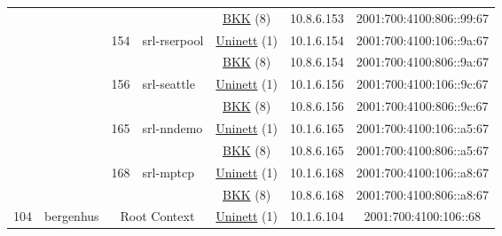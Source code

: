 \begin{small}
\begin{center}
\begin{longtable}{|c|c|c|c|c|c|c|c|}
  &  &  &  & \multicolumn{2}{|c|}{\tiny{\href{http://bkk.no}{BKK} (8)}} & \tiny{10.8.6.153} & \tiny{2001:700:4100:806::99:67} \\* \cline{3-3}\cline{4-4}\cline{5-5}\cline{6-6}\cline{7-7}\cline{8-8}
  &  & \multirow{2}{*}{\tiny{154}} & \multicolumn{1}{|l|}{\multirow{2}{*}{\tiny{srl-rserpool}}} & \multicolumn{2}{|c|}{\tiny{\href{https://www.uninett.no}{Uninett} (1)}} & \tiny{10.1.6.154} & \tiny{2001:700:4100:106::9a:67} \\* \cline{5-5}\cline{6-6}\cline{7-7}\cline{8-8}
  &  &  &  & \multicolumn{2}{|c|}{\tiny{\href{http://bkk.no}{BKK} (8)}} & \tiny{10.8.6.154} & \tiny{2001:700:4100:806::9a:67} \\* \cline{3-3}\cline{4-4}\cline{5-5}\cline{6-6}\cline{7-7}\cline{8-8}
  &  & \multirow{2}{*}{\tiny{156}} & \multicolumn{1}{|l|}{\multirow{2}{*}{\tiny{srl-seattle}}} & \multicolumn{2}{|c|}{\tiny{\href{https://www.uninett.no}{Uninett} (1)}} & \tiny{10.1.6.156} & \tiny{2001:700:4100:106::9c:67} \\* \cline{5-5}\cline{6-6}\cline{7-7}\cline{8-8}
  &  &  &  & \multicolumn{2}{|c|}{\tiny{\href{http://bkk.no}{BKK} (8)}} & \tiny{10.8.6.156} & \tiny{2001:700:4100:806::9c:67} \\* \cline{3-3}\cline{4-4}\cline{5-5}\cline{6-6}\cline{7-7}\cline{8-8}
  &  & \multirow{2}{*}{\tiny{165}} & \multicolumn{1}{|l|}{\multirow{2}{*}{\tiny{srl-nndemo}}} & \multicolumn{2}{|c|}{\tiny{\href{https://www.uninett.no}{Uninett} (1)}} & \tiny{10.1.6.165} & \tiny{2001:700:4100:106::a5:67} \\* \cline{5-5}\cline{6-6}\cline{7-7}\cline{8-8}
  &  &  &  & \multicolumn{2}{|c|}{\tiny{\href{http://bkk.no}{BKK} (8)}} & \tiny{10.8.6.165} & \tiny{2001:700:4100:806::a5:67} \\* \cline{3-3}\cline{4-4}\cline{5-5}\cline{6-6}\cline{7-7}\cline{8-8}
  &  & \multirow{2}{*}{\tiny{168}} & \multicolumn{1}{|l|}{\multirow{2}{*}{\tiny{srl-mptcp}}} & \multicolumn{2}{|c|}{\tiny{\href{https://www.uninett.no}{Uninett} (1)}} & \tiny{10.1.6.168} & \tiny{2001:700:4100:106::a8:67} \\* \cline{5-5}\cline{6-6}\cline{7-7}\cline{8-8}
  &  &  &  & \multicolumn{2}{|c|}{\tiny{\href{http://bkk.no}{BKK} (8)}} & \tiny{10.8.6.168} & \tiny{2001:700:4100:806::a8:67} \\ \hline
 \multirow{20}{*}{\tiny{104}} & \multicolumn{1}{|l|}{\multirow{20}{*}{\tiny{bergenhus}}} & \multicolumn{2}{|c|}{\multirow{2}{*}{\tiny{Root Context}}} & \multicolumn{2}{|c|}{\tiny{\href{https://www.uninett.no}{Uninett} (1)}} & \tiny{10.1.6.104} & \tiny{2001:700:4100:106::68} \\* \cline{5-5}\cline{6-6}\cline{7-7}\cline{8-8}

\end{longtable}
\end{center}
\end{small}
